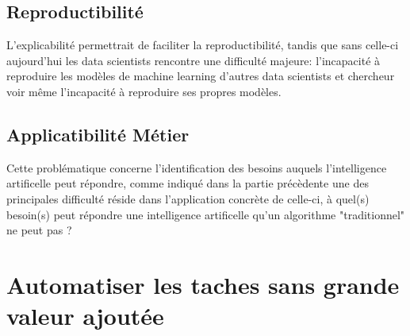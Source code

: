         \section{Reproductibilité}
        L'explicabilité permettrait de faciliter la reproductibilité, tandis que sans celle-ci 
        aujourd'hui les data scientists rencontre une difficulté majeure: 
        l'incapacité à reproduire les modèles de machine learning d'autres data scientists 
        et chercheur voir même l'incapacité à reproduire ses propres modèles. \newline 
            



        \section{Applicatibilité Métier}
            Cette problématique concerne l'identification des besoins auquels l'intelligence artificelle 
            peut répondre, comme indiqué dans la partie précèdente une des principales difficulté réside 
            dans l'application concrète de celle-ci, à quel(s) besoin(s) peut répondre une 
            intelligence artificelle qu'un algorithme "traditionnel" ne peut pas ? 




    \chapter{Automatiser les taches sans grande valeur ajoutée}

